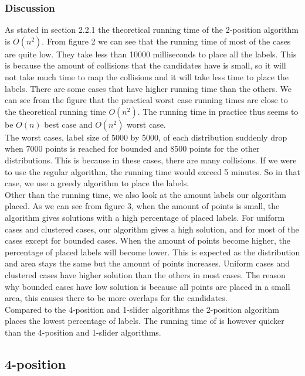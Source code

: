 \documentclass[crop=false,a4paper,oneside,11pt]{standalone}
\begin{document}
\subsubsection{Discussion}
As stated in section 2.2.1 the theoretical running time of the 2-position algorithm is $O(n^2)$. From figure 2 we can see that the running time of most of the cases are quite low. They take less than 10000 milliseconds to place all the labels. This is because the amount of collisions that the candidates have is small, so it will not take much time to map the collisions and it will take less time to place the labels. There are some cases that have higher running time than the others. We can see from the figure that the practical worst case running times are close to the theoretical running time $O(n^2)$. The running time in practice thus seems to be $O(n)$ best case and $O(n^2)$ worst case.\\
The worst cases, label size of 5000 by 5000, of each distribution suddenly drop when 7000 points is reached for bounded and 8500 points for the other distributions. This is because in these cases, there are many collisions. If we were to use the regular algorithm, the running time would exceed 5 minutes. So in that case, we use a greedy algorithm to place the labels.\\
Other than the running time, we also look at the amount labels our algorithm placed. As we can see from figure 3, when the amount of points is small, the algorithm gives solutions with a high percentage of placed labels. For uniform cases and clustered cases, our algorithm gives a high solution, and for most of the cases except for bounded cases. When the amount of points become higher, the percentage of placed labels will become lower. This is expected as the distribution and area stays the same but the amount of points increases. Uniform cases and clustered cases have higher solution than the others in most cases. The reason why bounded cases have low solution is because all points are placed in a small area, this causes there to be more overlaps for the candidates.\\
Compared to the 4-position and 1-slider algorithms the 2-position algorithm places the lowest percentage of labels. The running time of is however quicker than the 4-position and 1-slider algorithms. 


\subsection{4-position}
\end{document}
